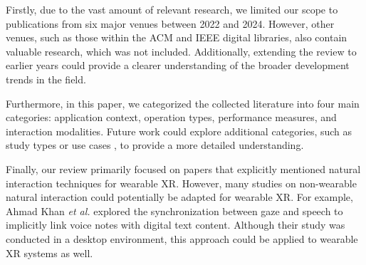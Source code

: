 \documentclass[review]{fcs}
\newcommand{\revise}[2]{\textcolor[rgb]{0,0,0}{#2}}
\newcommand{\ccite}{\textcolor[rgb]{0,0,1}{[cite]}}
\begin{document}
Firstly, due to the vast amount of relevant research, we limited our scope to publications from six major venues between 2022 and 2024.
\revise{However, other venues, such as those within the ACM and IEEE digital libraries, also contain valuable research that was not included.}{However, other venues, such as those within the ACM and IEEE digital libraries, also contain valuable research, which was not included.} Additionally, extending the review to earlier years could provide a clearer understanding of the broader development trends in the field.

Furthermore, in this paper, we categorized the collected literature into four main categories: application context, operation types, performance measures, and interaction modalities. Future work could explore additional categories, such as study types or use cases \cite{DBLP:journals/tvcg/SpittlePC023}, to provide a more detailed understanding.

Finally, our review primarily focused on papers that explicitly mentioned natural interaction techniques for wearable XR. However, many studies on non-wearable natural interaction could potentially be adapted for wearable XR. 
\revise{For example, Ahmad Khan \textit{et al.} explored the synchronization between gaze and speech to implicitly link voice notes with digital text content \cite{10.1145/3491102.3502134}.}{For example, Ahmad Khan \textit{et al.} \cite{10.1145/3491102.3502134} explored the synchronization between gaze and speech to implicitly link voice notes with digital text content.} Although their study was conducted in a desktop environment, this approach could be applied to wearable XR systems as well.

\end{document}
